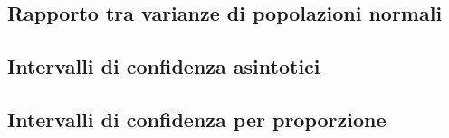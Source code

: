         \subsection{Rapporto tra varianze di popolazioni normali}
        \subsection{Intervalli di confidenza asintotici}
        \subsection{Intervalli di confidenza per proporzione}
